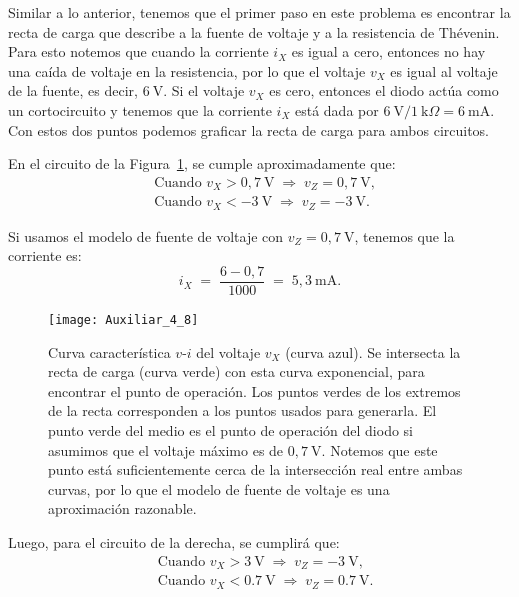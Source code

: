 \documentclass[
  11pt,
  letterpaper,
   addpoints,
   answers
  ]{exam}
\begin{document}
\begin{questions}
\begin{solution}

Similar a lo anterior, tenemos que el primer paso en este problema es encontrar la recta de carga que describe a la fuente de voltaje y a la resistencia de Thévenin. Para esto notemos que cuando la corriente \(i_X\) es igual a cero, entonces no hay una caída de voltaje en la resistencia, por lo que el voltaje \(v_X\) es igual al voltaje de la fuente, es decir, \(6~\text{V}\). Si el voltaje \(v_X\) es cero, entonces el diodo actúa como un cortocircuito y tenemos que la corriente \(i_X\) está dada por \(6~\text{V}/1~\text{k}\Omega = 6~\text{mA}\). Con estos dos puntos podemos graficar la recta de carga para ambos circuitos.

\medskip
En el circuito de la Figura~\ref{fig:carac-v-i}, se cumple aproximadamente que:
\begin{align*}
&\text{Cuando } v_X > 0{,}7~\text{V} \;\Rightarrow\; v_Z = 0{,}7~\text{V},\\
&\text{Cuando } v_X < -3~\text{V} \;\Rightarrow\; v_Z = -3~\text{V}.
\end{align*}

Si usamos el modelo de fuente de voltaje con \(v_Z = 0{,}7~\text{V}\), tenemos que la corriente es:
\[
i_X \;=\; \frac{6 - 0{,}7}{1000} \;=\; 5{,}3~\text{mA}.
\]

\begin{figure}[H]
  \centering
  \texttt{[image: Auxiliar\_4\_8]}
  \caption{Curva característica \(v\)-\(i\) del voltaje \(v_X\) (curva azul). 
  Se intersecta la recta de carga (curva verde) con esta curva exponencial, para encontrar el punto de operación. 
  Los puntos verdes de los extremos de la recta corresponden a los puntos usados para generarla. 
  El punto verde del medio es el punto de operación del diodo si asumimos que el voltaje máximo es de \(0{,}7~\text{V}\). 
  Notemos que este punto está suficientemente cerca de la intersección real entre ambas curvas, por lo que el modelo de fuente de voltaje es una aproximación razonable.}
  \label{fig:carac-v-i}
\end{figure}


Luego, para el circuito de la derecha, se cumplirá que:
\begin{align*}
&\text{Cuando } v_X > 3~\text{V} \;\Rightarrow\; v_Z = -3~\text{V},\\
&\text{Cuando } v_X < 0.7~\text{V} \;\Rightarrow\; v_Z = 0.7~\text{V}.
\end{align*}


\end{solution}
\end{questions}
\end{document}
